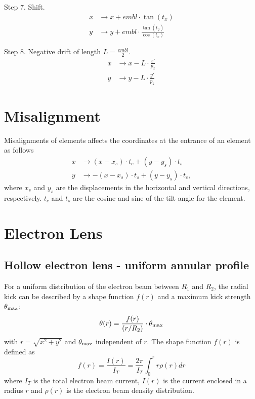 \documentclass[english]{article}
\begin{document}
Step 7. Shift.
\begin{align*}
    x &\to x + embl\cdot \tan(t_x) \\
    y &\to y + embl\cdot\frac{\tan(t_y)}{\cos(t_x)}
\end{align*}

Step 8. Negative drift of length $L=\frac{embl}{2}$.
\begin{align*}
    x &\to x - L\cdot \frac{x'}{p_z} \\
    y &\to y - L\cdot \frac{y'}{p_z}
\end{align*}


\section{Misalignment}

Misalignments of elements affects the coordinates at the entrance of an
element as follows
\begin{align*}
    x &\to (x-x_s)\cdot t_c + (y-y_s)\cdot t_s \\
    y &\to -(x-x_s)\cdot t_s + (y-y_s)\cdot t_c,
\end{align*}
where $x_s$ and $y_s$ are the displacements in the horizontal and vertical
directions, respectively. $t_c$ and $t_s$ are the cosine and sine of the tilt
angle for the element.

\section{Electron Lens}
\label{elense}
\subsection{Hollow electron lens - uniform annular profile}
For a uniform distribution of the electron beam between $R_1$ and $R_2$, the radial kick can be described by a shape function $f(r)$ and a maximum kick strength $\theta_{\rm max}$:
\begin{equation}
\theta(r)=\frac{f(r)}{(r/R_2)}\cdot \theta_{\rm max}
\end{equation}
with $r=\sqrt{x^2+y^2}$ and $\theta_{\rm max}$ independent of $r$. The shape function $f(r)$ is defined as
\begin{equation}
f(r) = \frac{I(r)}{I_T}=\frac{2\pi}{I_T}\int_{0}^r r\rho(r) dr
\end{equation}
where $I_T$ is the total electron beam current, $I(r)$ is the current enclosed in a radius $r$ and $\rho(r)$ is the electron beam density distribution.
\end{document}
